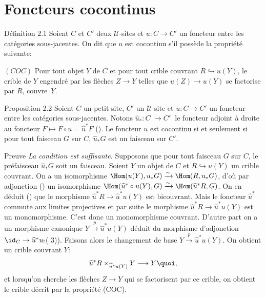 \section{Foncteurs cocontinus}

\begin{enonce*}{Définition 2.1}
Soient $C$ et $C'$ deux $𝒰$-sites et $u:C\rightarrow C'$ un
foncteur entre les catégories sous-jacentes. On dit que $u$ est
cocontinu s'il possède la propriété suivante:

$(COC)$ Pour tout objet $Y$ de $C$ et pour tout crible couvrant
$R\hookrightarrow u(Y)$, le crible de $Y$ engendré par les
flèches $Z\rightarrow Y$ telles que $u(Z)\rightarrow u(Y)$ se
factorise par $R$, couvre~$Y$.
\end{enonce*}

\begin{enonce*}{Proposition 2.2}
Soient $C$ un petit site, $C'$ un $𝒰$-site et
$u:C\rightarrow C'$ un foncteur entre les catégories sous-jacentes.
Notons $\widehat{u}_{\ast}:C^{\widehat{\phantom{,}}}\rightarrow
{C'}^{\widehat{\phantom{,}}}$ le foncteur adjoint à droite au
foncteur $F\mapsto F\circ u=\widehat{u}^{\ast}F$ {\rm
().} Le foncteur $u$ est cocontinu si et seulement si
pour tout faisceau $G$ sur $C$, $\widehat{u}_{\ast}G$ est un
faisceau sur $C'$.
\end{enonce*}

\begin{enonce*}[remark]{Preuve}
\emph{La condition est suffisante.} Supposons que pour tout faisceau
$G$ sur $C$, le préfaisceau $\widehat{u}_{\ast}G$ soit un faisceau.
Soient $Y$ un objet de $C$ et $R\hookrightarrow u(Y)$ un crible
couvrant. On a un isomorphisme $\Hom(u(Y),
u_{\ast}G)\xrightarrow{\sim}\Hom(R,u_{\ast}G)$, d'où par
adjonction () un isomorphisme
$\Hom(\widehat{u}^{\ast}\circ
u(Y),G)\xrightarrow{\sim}\Hom(\widehat{u}^{\ast}R,G)$. On en déduit
() que le morphisme $\widehat{u}^{\ast}R\rightarrow
\widehat{u}^{\ast}u(Y)$ est bicouvrant. Mais le foncteur
$\widehat{u}^{\ast}$ commute aux limites projectives et par suite le
morphisme $\widehat{u}^{\ast}R\rightarrow \widehat{u}^{\ast}u(Y)$
est un monomorphisme. C'est donc un monomorphisme couvrant. D'autre
part on a un morphisme canonique
$Y\xrightarrow{p}\widehat{u}^{\ast}u(Y)$ déduit du morphisme
d'adjonction $\id_C\rightarrow
\widehat{u}^{\ast}u_{!}$\pageoriginale ( 3)). Faisons
alors le changement de base
$Y\xrightarrow{p}\widehat{u}^{\ast}u(Y)$. On obtient un crible
couvrant $Y$:
$$
\widehat{u}^{\ast}R\times_{\widehat{u}^{\ast}u(Y)}Y\longrightarrow
Y{\quoi},
$$
et lorsqu'on cherche les flèches $Z\rightarrow Y$ qui se
factorisent par ce crible, on obtient le crible décrit par la
propriété (COC).
\end{enonce*}

